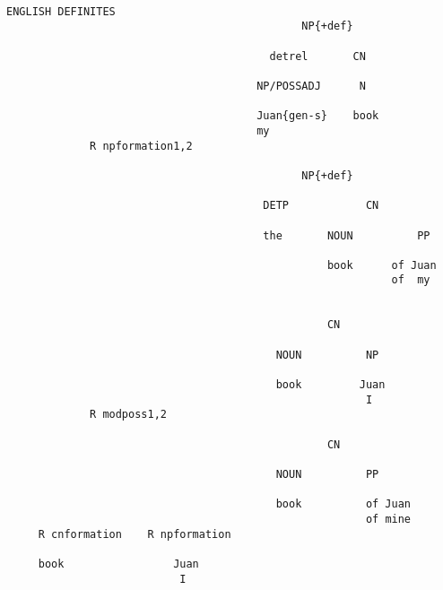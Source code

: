 \begin{verbatim}

ENGLISH DEFINITES
                                              NP{+def}

                                         detrel       CN

                                       NP/POSSADJ      N

                                       Juan{gen-s}    book
                                       my
             R npformation1,2

                                              NP{+def}

                                        DETP            CN

                                        the       NOUN          PP

                                                  book      of Juan
                                                            of  my


                                                  CN
                                            
                                          NOUN          NP

                                          book         Juan              
                                                        I
             R modposs1,2

                                                  CN

                                          NOUN          PP

                                          book          of Juan
                                                        of mine
     R cnformation    R npformation

     book                 Juan                           
                           I
\end{verbatim}
\newpage
